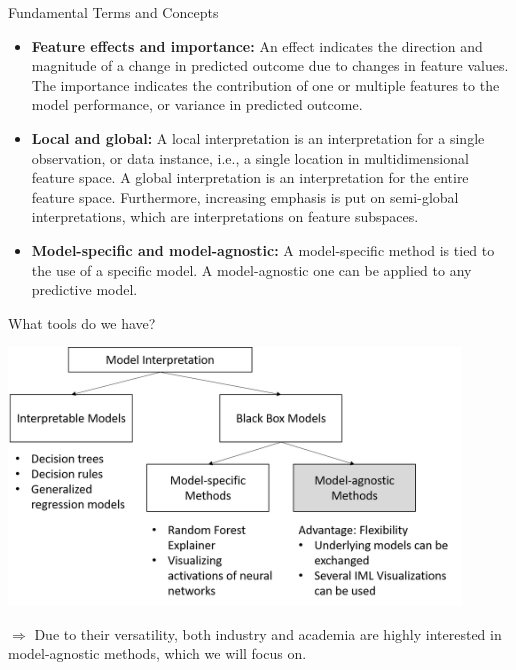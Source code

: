 \documentclass[11pt,compress,t,notes=noshow, xcolor=table]{beamer}
\begin{document}
\begin{vbframe}{Fundamental Terms and Concepts}
\begin{itemize}
\itemsep1em
\item \textbf{Feature effects and importance:} An effect indicates the direction and magnitude of a change in predicted outcome due to changes in feature values. The importance indicates the contribution of one or multiple features to the model performance, or variance in predicted outcome.
\item \textbf{Local and global:} A local interpretation is an interpretation for a single observation, or data instance, i.e., a single location in multidimensional feature space. A global interpretation is an interpretation for the entire feature space. Furthermore, increasing emphasis is put on semi-global interpretations, which are interpretations on feature subspaces.
\item \textbf{Model-specific and model-agnostic:} A model-specific method is tied to the use of a specific model. A model-agnostic one can be applied to any predictive model.
\end{itemize}
\end{vbframe}

\begin{vbframe}{What tools do we have?}
 \begin{center}
  \includegraphics[width=0.9\textwidth]{figure/overview}
 \end{center}
 $\Rightarrow$ Due to their versatility, both industry and academia are highly interested in model-agnostic methods, which we will focus on.
\end{vbframe}
\end{document}
